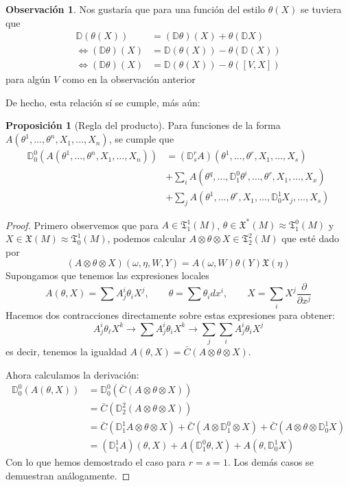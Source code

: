 \documentclass[spanish]{book}
\theoremstyle{definition}
\newtheorem*{prop}{Proposición}
\newtheorem*{obs}{Observación}
\newcommand{\D}{\mathbb{D}}
\newcommand{\X}{\mathfrak{X}}
\newcommand{\T}{\mathfrak{T}}
\begin{document}
	\begin{obs}
		Nos gustaría que para una función del estilo $\theta(X)$ se tuviera que
		\begin{align*}
			\D(\theta(X))&=(\D\theta)(X)+\theta(\D X)\\
		\iff(\D\theta)(X)&=\D(\theta(X))-\theta(\D(X))\\
		\iff(\D\theta)(X)&=\D(\theta(X))-\theta([V,X])
		\end{align*}
		para algún $V$ como en la observación anterior
	\end{obs}
		De hecho, esta relación sí se cumple, más aún:
	\begin{prop}[Regla del producto]
		Para funciones de la forma $A(\theta^1,\ldots,\theta^n,X_1,\ldots,X_n)$, se cumple que
		\begin{align*}
			\D^0_0(A(\theta^1,\ldots,\theta^n,X_1,\ldots,X_n))&=(\D^r_sA)(\theta^1,\ldots,\theta^r,X_1,\ldots,X_s)\\
			&+\sum_iA(\theta^q,\ldots,\D_1^0\theta^i,\ldots,\theta^r,X_1,\ldots,X_x)\\
			&+\sum_jA(\theta^1,\ldots,\theta^r,X_1,\ldots,\D^1_0X_j,\ldots,X_s)
		\end{align*}
	\end{prop}
	\begin{proof}
		Primero observemos que para $A\in\T^1_1(M)$, $\theta\in\X^*(M)\approx\T^0_1(M)$ y $X\in\X(M)\approx\T^1_0(M)$, podemos calcular $A\otimes\theta\otimes X\in\T^2_2(M)$ que esté dado por
		\[(A\otimes\theta\otimes X)(\omega,\eta,W,Y)=A(\omega,W)\theta(Y)\X(\eta)\]
		Supongamos que tenemos las expresiones locales \[A(\theta,X)=\sum A^i_j\theta_iX^j,\qquad\theta=\sum\theta_idx^i,\qquad X=\sum_iX^j\frac{\partial}{\partial x^j}\]
		Hacemos dos contracciones directamente sobre estas expresiones para obtener:
		\[A^i_j\theta_\ell X^k\to\sum A^i_j\theta_iX^k\to\sum_j\sum_iA^i_j\theta_iX^j\]
		es decir, tenemos la igualdad $A(\theta,X)=\bar{C}(A\otimes\theta\otimes X)$.
		
		Ahora calculamos la derivación:
		\begin{align*}
			\D^0_0(A(\theta,X))&=\D^0_0(\bar{C}(A\otimes\theta\otimes X))\\
			&=\bar{C}(\D^2_2(A\otimes\theta\otimes X))\\
			&=\bar{C}(\D^1_1A\otimes\theta\otimes X)+\bar{C}(A\otimes\D^0_1\otimes X)+\bar{C}(A\otimes\theta\otimes\D^1_0X)\\
			&=(\D^1_1A)(\theta,X)+A(\D^0_1\theta,X)+A(\theta,\D^1_0X)
		\end{align*}
		Con lo que hemos demostrado el caso para $r=s=1$. Los demás casos se demuestran análogamente.
	\end{proof}
	
\end{document}
